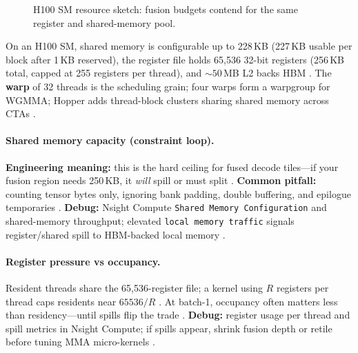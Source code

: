 \begin{figure}[t]
\centering
{}
\caption{H100 SM resource sketch: fusion budgets contend for the same register and shared-memory pool.}
\label{fig:gpu_sm_resources}
\end{figure}

On an H100 SM, shared memory is configurable up to 228\,KB (227\,KB usable per block after 1\,KB reserved), the register file holds 65{,}536 32-bit registers (256\,KB total, capped at 255 registers per thread), and ${\sim}50$\,MB L2 backs HBM \citep{nvidia2022hopper}.
The \textbf{warp} of 32 threads is the scheduling grain; four warps form a warpgroup for WGMMA; Hopper adds thread-block clusters sharing shared memory across CTAs \citep{shah2024flashattention3}.

\paragraph{Shared memory capacity (constraint loop).}
\textbf{Engineering meaning:} this is the hard ceiling for fused decode tiles---if your fusion region needs 250\,KB, it \emph{will} spill or must split \citep{memoryfloor2026}.
\textbf{Common pitfall:} counting tensor bytes only, ignoring bank padding, double buffering, and epilogue temporaries \citep{nvidia2022hopper}.
\textbf{Debug:} Nsight Compute \texttt{Shared Memory Configuration} and shared-memory throughput; elevated \texttt{local memory traffic} signals register/shared spill to HBM-backed local memory \citep{taxbreak2026}.

\paragraph{Register pressure vs occupancy.}
Resident threads share the 65{,}536-register file; a kernel using $R$ registers per thread caps residents near $65536/R$ \citep{nvidia2022hopper}.
At batch-1, occupancy often matters less than residency---until spills flip the trade \citep{memoryfloor2026}.
\textbf{Debug:} register usage per thread and spill metrics in Nsight Compute; if spills appear, shrink fusion depth or retile before tuning MMA micro-kernels \citep{yirage2026}.

